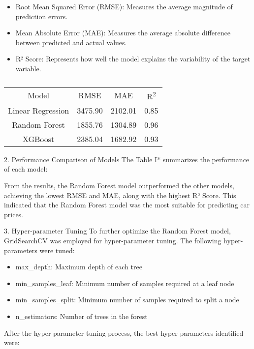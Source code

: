 \documentclass[journal]{IEEEtran}
\begin{document}
\begin{itemize}
    \item Root Mean Squared Error (RMSE): Measures the average magnitude of prediction errors.
    \item Mean Absolute Error (MAE): Measures the average absolute difference between predicted and actual values.
    \item R² Score: Represents how well the model explains the variability of the target variable.
\end{itemize}


\begin{table}
    \centering
    \begin{tabular}{cccc}
        Model & RMSE & MAE & R\textsuperscript{2}\\
         Linear Regression&3475.90  & 2102.01 & 0.85\\
        Random Forest &1855.76  &1304.89  &0.96 \\
         XGBoost& 2385.04 & 1682.92 &0.93 \\
    \end{tabular}
    \caption{}
    \label{tab:All Regressions Evaluation}
\end{table}
2. Performance Comparison of Models\newline
The Table I* summarizes the performance of each model:


From the results, the Random Forest model outperformed the other models, achieving the lowest RMSE and MAE, along with the highest R² Score. This indicated that the Random Forest model was the most suitable for predicting car prices.\vspace{2mm}

3. Hyper-parameter Tuning
To further optimize the Random Forest model, GridSearchCV was employed for hyper-parameter tuning. The following hyper-parameters were tuned:

\begin{itemize}
    \item max\_depth: Maximum depth of each tree
    \item min\_samples\_leaf: Minimum number of samples required at a leaf node
    \item min\_samples\_split: Minimum number of samples required to split a node
    \item n\_estimators: Number of trees in the forest
\end{itemize}
After the hyper-parameter tuning process, the best hyper-parameters identified were:
\end{document}
